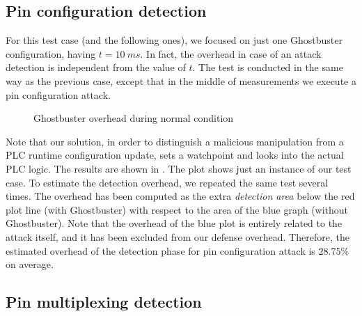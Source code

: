 \subsection{Pin configuration detection}

For this test case (and the following ones), we focused on just one Ghostbuster configuration, having $t = \SI{10}{ms}$.
In fact, the overhead in case of an attack detection is independent from the value of $t$.
The test is conducted in the same way as the previous case, except that in the middle of measurements we execute a pin configuration attack.
\begin{figure}[h]
\centering
{}
\caption{Ghostbuster overhead during normal condition}
\label{fig:pinconf-overhead}
\end{figure}
Note that our solution, in order to distinguish a malicious manipulation from a PLC runtime configuration update, sets a watchpoint and looks into the actual PLC logic.
The results are shown in .
The plot shows just an instance of our test case. To estimate the detection overhead, we repeated the same test several times.
The overhead has been computed as the extra \emph{detection area} below the red plot line (with Ghostbuster) with respect to the area of the blue graph (without Ghostbuster).
Note that the overhead of the blue plot is entirely related to the attack itself, and it has been excluded from our defense overhead.
Therefore, the estimated overhead of the detection phase for pin configuration attack is $28.75\%$ on average.


\subsection{Pin multiplexing detection}

